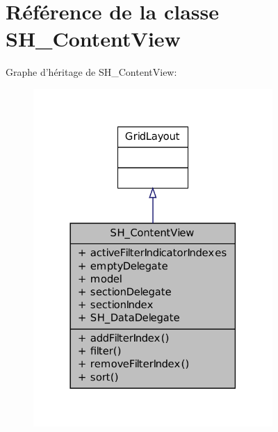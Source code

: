 \hypertarget{classSH__ContentView}{\section{Référence de la classe S\-H\-\_\-\-Content\-View}
\label{classSH__ContentView}
}


Graphe d'héritage de S\-H\-\_\-\-Content\-View\-:
\nopagebreak
\begin{figure}[H]
\begin{center}
\leavevmode
\includegraphics[width=258pt]{classSH__ContentView__inherit__graph}
\end{center}
\end{figure}


